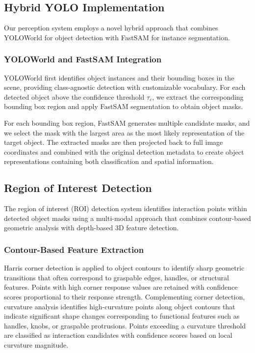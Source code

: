 \subsection{Hybrid YOLO Implementation}
\label{subsec:hybrid_yolo}

Our perception system employs a novel hybrid approach that combines YOLOWorld for object detection with FastSAM for instance segmentation.

\subsubsection{YOLOWorld and FastSAM Integration}
\label{subsubsec:yolo_fastsam_integration}

 YOLOWorld first identifies object instances and their bounding boxes in the scene, providing class-agnostic detection with customizable vocabulary. For each detected object above the confidence threshold $\tau_c$, we extract the corresponding bounding box region and apply FastSAM segmentation to obtain object masks.

 For each bounding box region, FastSAM generates multiple candidate masks, and we select the mask with the largest area as the most likely representation of the target object. The extracted masks are then projected back to full image coordinates and combined with the original detection metadata to create object representations containing both classification and spatial information.


\subsection{Region of Interest Detection}
\label{subsec:roi_detection}

The region of interest (ROI) detection system identifies interaction points within detected object masks using a multi-modal approach that combines contour-based geometric analysis with depth-based 3D feature detection.

\subsubsection{Contour-Based Feature Extraction}
\label{subsubsec:contour_features}

Harris corner detection is applied to object contours to identify sharp geometric transitions that often correspond to graspable edges, handles, or structural features. Points with high corner response values are retained with confidence scores proportional to their response strength. Complementing corner detection, curvature analysis identifies high-curvature points along object contours that indicate significant shape changes corresponding to functional features such as handles, knobs, or graspable protrusions. Points exceeding a curvature threshold are classified as interaction candidates with confidence scores based on local curvature magnitude.

